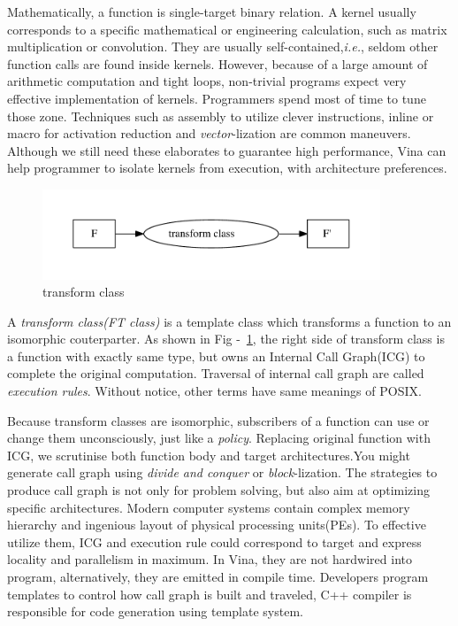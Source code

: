 \documentclass[a4paper, 11pt]{article}
\begin{document}
Mathematically, a function is single-target binary relation. A kernel usually corresponds to a specific mathematical or engineering calculation, such as matrix multiplication or convolution. They are usually self-contained,\textit{i.e.}, seldom other function calls are found inside kernels. However, because of a large amount of arithmetic computation and tight loops, non-trivial programs expect very effective implementation of kernels. Programmers spend most of time to tune those zone. Techniques such as assembly to utilize clever instructions, inline or macro for activation reduction  and \textit{vector}-lization are common maneuvers. Although we still need these elaborates to guarantee high performance, Vina can help programmer to isolate kernels from execution, with architecture preferences.
\begin{figure}
\centering
\includegraphics[width=0.9\textwidth]{map-class}
\caption{transform class}
\label{transform-class}
\end{figure}


A \emph{transform class(FT class)} is a template class which transforms a function to an isomorphic couterparter. As shown in Fig -~\ref{transform-class}, the right side of transform class is a function with exactly same type, but owns an Internal Call Graph(ICG) to complete the original computation. Traversal of internal call graph are called \emph{execution rules}. Without notice, other terms have same meanings of POSIX.  

Because transform classes are isomorphic, subscribers of a function can use or change them unconsciously, just like a \emph{policy}.  Replacing original function with ICG, we scrutinise both function body and target architectures.You might generate call graph using \textit{divide and conquer} or \textit{block}-lization. The strategies to produce call graph is not only for problem solving, but also aim at optimizing specific architectures. Modern computer systems contain complex memory hierarchy and ingenious layout of physical processing units(PEs). To effective utilize them, ICG and execution rule could correspond to target and express locality and parallelism in maximum. In Vina, they are not hardwired into program, alternatively, they are emitted in compile time. Developers program templates to control how call graph is built and traveled, C++ compiler is responsible for code generation using template system.
\end{document}
